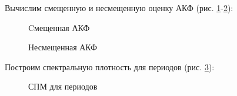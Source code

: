 \documentclass[a4paper,oneside,14pt]{extreport}
\begin{document}
Вычислим смещенную и несмещенную оценку АКФ (рис. \ref{task2_acf_biased}-\ref{task2_acf_unbiased}):
\begin{figure}[!h]
	\caption{Cмещенная АКФ}
	\label{task2_acf_biased}
\end{figure}

\newpage
\begin{figure}[!h]
	\caption{Несмещенная АКФ}
	\label{task2_acf_unbiased}
\end{figure}

Построим спектральную плотность для периодов (рис. \ref{task2_psd_periods}):
\begin{figure}[!h]
	\caption{СПМ для периодов}
	\label{task2_psd_periods}
\end{figure}
\end{document}
